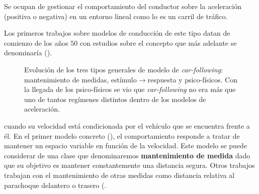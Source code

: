 Se ocupan de gestionar el comportamiento del conductor sobre la aceleración (positiva o negativa) en un entorno lineal como lo es un carril de tráfico.

Los primeros trabajos sobre modelos de conducción de este tipo datan de comienzo de los años $50$ con estudios sobre el concepto que más adelante se denominaría \textit{} (\cite{reuschel1950fahrzeugbewegungen, Pipes1953}).

\begin{figure}
	\centering
	\caption{Evolución de los tres tipos generales de modelo de \textit{car-following}: mantenimiento de medidas, estímulo$\rightarrow$respuesta y psico-físicos. Con la llegada de los psico-físicos se vio que \textit{car-following} no era más que uno de tantos regímenes distintos dentro de los modelos de aceleración.}
	\label{fig:car-following-there-different-models}
\end{figure}

 cuando su velocidad está condicionada por el vehículo que se encuentra frente a él. En el primer modelo concreto (\cite{Pipes1953}), el comportamiento responde a tratar de mantener un espacio variable en función de la velocidad. Este modelo se puede considerar de una clase que denominaremos \textbf{mantenimiento de medida} dado que su objetivo es mantener constantemente una distancia segura. Otros trabajos trabajan con el mantenimiento de otras medidas como distancia relativa al parachoque delantero o trasero (.

